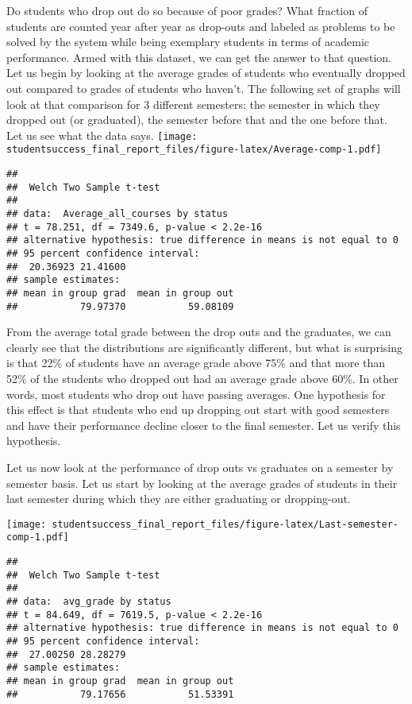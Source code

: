 \documentclass[]{book}
\theoremstyle{definition}
\theoremstyle{definition}
\theoremstyle{remark}
\begin{document}
Do students who drop out do so because of poor grades? What fraction of
students are counted year after year as drop-outs and labeled as
problems to be solved by the system while being exemplary students in
terms of academic performance. Armed with this dataset, we can get the
answer to that question. Let us begin by looking at the average grades
of students who eventually dropped out compared to grades of students
who haven't. The following set of graphs will look at that comparison
for 3 different semesters: the semester in which they dropped out (or
graduated), the semester before that and the one before that. Let us see
what the data says.
\texttt{[image: studentsuccess\_final\_report\_files/figure-latex/Average-comp-1.pdf]}

\begin{verbatim}
## 
##  Welch Two Sample t-test
## 
## data:  Average_all_courses by status
## t = 78.251, df = 7349.6, p-value < 2.2e-16
## alternative hypothesis: true difference in means is not equal to 0
## 95 percent confidence interval:
##  20.36923 21.41600
## sample estimates:
## mean in group grad  mean in group out 
##           79.97370           59.08109
\end{verbatim}

From the average total grade between the drop outs and the graduates, we
can clearly see that the distributions are significantly different, but
what is surprising is that 22\% of students have an average grade above
75\% and that more than 52\% of the students who dropped out had an
average grade above 60\%. In other words, most students who drop out
have passing averages. One hypothesis for this effect is that students
who end up dropping out start with good semesters and have their
performance decline closer to the final semester. Let us verify this
hypothesis.

Let us now look at the performance of drop outs vs graduates on a
semester by semester basis. Let us start by looking at the average
grades of students in their last semester during which they are either
graduating or dropping-out.

\texttt{[image: studentsuccess\_final\_report\_files/figure-latex/Last-semester-comp-1.pdf]}

\begin{verbatim}
## 
##  Welch Two Sample t-test
## 
## data:  avg_grade by status
## t = 84.649, df = 7619.5, p-value < 2.2e-16
## alternative hypothesis: true difference in means is not equal to 0
## 95 percent confidence interval:
##  27.00250 28.28279
## sample estimates:
## mean in group grad  mean in group out 
##           79.17656           51.53391
\end{verbatim}
\end{document}
